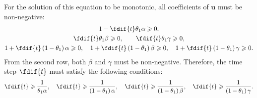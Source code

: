 \documentclass{article}
\begin{document}
For the solution of this equation to be monotonic, all coefficients of
\(\symbf{u}\) must be non-negative:
\begin{gather*}
    1 - \fdif{t} \theta_1 \alpha \geqslant 0, \\
    \fdif{t} \theta_1 \beta \geqslant 0, \qquad \fdif{t} \theta_1 \gamma \geqslant 0, \\
    1 + \fdif{t} \left( 1 - \theta_1 \right) \alpha \geqslant 0, \quad 1 + \fdif{t} \left( 1 - \theta_1 \right) \beta \geqslant 0, \quad 1 + \fdif{t} \left( 1 - \theta_1 \right) \gamma \geqslant 0.
\end{gather*}
From the second row, both \(\beta\) and \(\gamma\) must be non-negative.
Therefore, the time step \(\fdif{t}\) must satisfy the following
conditions:
\begin{equation*}
    \fdif{t} \geqslant \frac{1}{\theta_1 \alpha}, \quad \fdif{t} \geqslant \frac{1}{\left( 1 - \theta_1 \right) \alpha}, \quad \fdif{t} \geqslant \frac{1}{\left( 1 - \theta_1 \right) \beta}, \quad \fdif{t} \geqslant \frac{1}{\left( 1 - \theta_1 \right) \gamma}.
\end{equation*}
\end{document}

